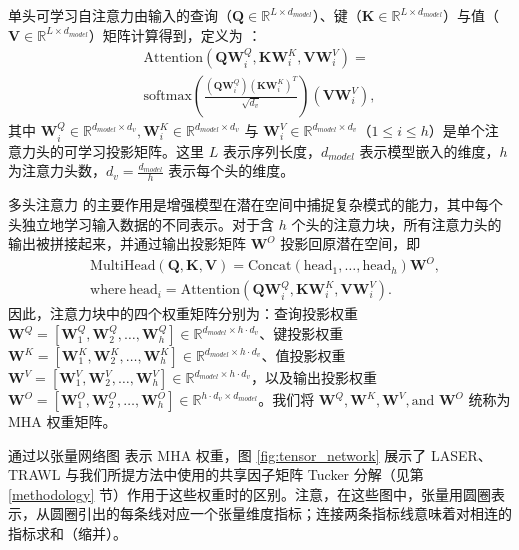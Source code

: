 \documentclass[conference]{IEEEtran}
\begin{document}
单头可学习自注意力由输入的查询（$\mathbf{Q} \in \mathbb{R}^{L \times d_{model}}$）、键（$\mathbf{K} \in \mathbb{R}^{L \times d_{model}}$）与值（$\mathbf{V} \in \mathbb{R}^{L \times d_{model}}$）矩阵计算得到，定义为 \cite{vaswani2017attention}：
\begin{multline} 
    \text{Attention}(\mathbf{Q}\mathbf{W}^Q_i, \mathbf{K}\mathbf{W}^K_i, \mathbf{V}\mathbf{W}^V_i) = \\ 
\text{softmax}\left(\frac{\left(\mathbf{Q}\mathbf{W}^Q_i \right) \left(\mathbf{K}\mathbf{W}^K_i \right)^T}{\sqrt{d_{v}}}\right) \left(\mathbf{V}\mathbf{W}^V_i \right),
\label{eq:self_attention} 
\end{multline}
其中 $\mathbf{W}^Q_i \in \mathbb{R}^{d_{model} \times d_{v}}, \mathbf{W}^K_i \in \mathbb{R}^{d_{model} \times d_{v}}$ 与 $\mathbf{W}^V_i \in \mathbb{R}^{d_{model} \times d_{v}}$（$1\leq i \leq h$）是单个注意力头的可学习投影矩阵。这里 $L$ 表示序列长度，$d_{model}$ 表示模型嵌入的维度，$h$ 为注意力头数，$d_v = \frac{d_{model}}{h}$ 表示每个头的维度。

多头注意力 \cite{vaswani2017attention} 的主要作用是增强模型在潜在空间中捕捉复杂模式的能力，其中每个头独立地学习输入数据的不同表示。对于含 $h$ 个头的注意力块，所有注意力头的输出被拼接起来，并通过输出投影矩阵 $\mathbf{W}^O$ 投影回原潜在空间，即
\begin{equation}
\begin{split}
   & \text{MultiHead}(\mathbf{Q}, \mathbf{K}, \mathbf{V}) = \text{Concat}(\text{head}_1, \ldots, \text{head}_h) \mathbf{W}^O, \\
 & \text{where} \  \text{head}_i = \text{Attention}(\mathbf{Q}\mathbf{W}^Q_i, \mathbf{K}\mathbf{W}^K_i, \mathbf{V}\mathbf{W}^V_i).
\end{split}
\label{eq:MHA}
\end{equation}
因此，注意力块中的四个权重矩阵分别为：查询投影权重 $\mathbf{W}^Q = \left[\mathbf{W}^Q_1, \mathbf{W}^Q_2, \ldots, \mathbf{W}^Q_h \right] \in \mathbb{R}^{d_{model} \times h \cdot d_v}$、键投影权重 $\mathbf{W}^K = \left[\mathbf{W}^K_1, \mathbf{W}^K_2, \ldots, \mathbf{W}^K_h \right] \in \mathbb{R}^{d_{model} \times h \cdot d_v}$、值投影权重 $\mathbf{W}^V = \left[\mathbf{W}^V_1, \mathbf{W}^V_2, \ldots, \mathbf{W}^V_h \right] \in \mathbb{R}^{d_{model} \times h \cdot d_v}$，以及输出投影权重 $\mathbf{W}^{O} = \left[\mathbf{W}^O_1, \mathbf{W}^O_2, \ldots, \mathbf{W}^O_h \right] \in \mathbb{R}^{h \cdot d_v \times d_{model}}$。我们将 $\mathbf{W}^Q, \mathbf{W}^K, \mathbf{W}^V, \text{and } \mathbf{W}^O$ 统称为 MHA 权重矩阵。\par
通过以张量网络图 \cite{orus2014practical} 表示 MHA 权重，图 \ref{fig:tensor_network} 展示了 LASER、TRAWL 与我们所提方法中使用的共享因子矩阵 Tucker 分解（见第 \ref{methodology} 节）作用于这些权重时的区别。注意，在这些图中，张量用圆圈表示，从圆圈引出的每条线对应一个张量维度指标；连接两条指标线意味着对相连的指标求和（缩并）。
\end{document}
